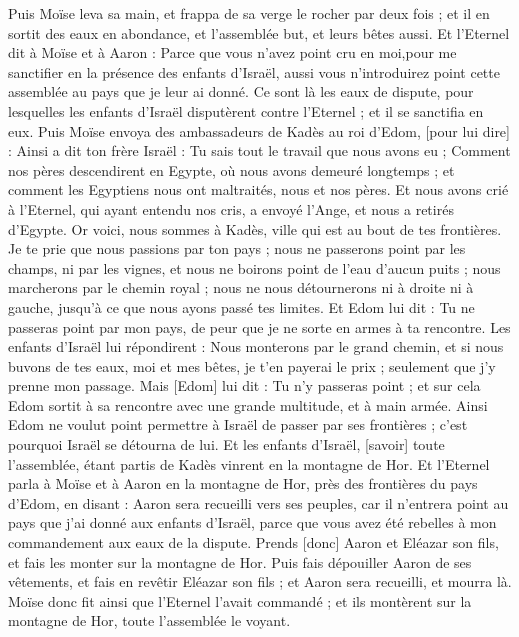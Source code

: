 \begin{multicols}{2}
Puis Moïse leva sa main, et frappa de sa verge le rocher par deux fois ; et il en sortit des eaux en abondance, et l'assemblée but, et leurs bêtes aussi.
Et l'Eternel dit à Moïse et à Aaron : Parce que vous n'avez point cru en moi,pour me sanctifier en la présence des enfants d'Israël, aussi vous n'introduirez point cette assemblée au pays que je leur ai donné.
Ce sont là les eaux de dispute, pour lesquelles les enfants d'Israël disputèrent contre l'Eternel ; et il se sanctifia en eux.
Puis Moïse envoya des ambassadeurs de Kadès au roi d'Edom, [pour lui dire] : Ainsi a dit ton frère Israël : Tu sais tout le travail que nous avons eu ;
Comment nos pères descendirent en Egypte, où nous avons demeuré longtemps ; et comment les Egyptiens nous ont maltraités, nous et nos pères.
Et nous avons crié à l'Eternel, qui ayant entendu nos cris, a envoyé l'Ange, et nous a retirés d'Egypte. Or voici, nous sommes à Kadès, ville qui est au bout de tes frontières.
Je te prie que nous passions par ton pays ; nous ne passerons point par les champs, ni par les vignes, et nous ne boirons point de l'eau d'aucun puits ; nous marcherons par le chemin royal ; nous ne nous détournerons ni à droite ni à gauche, jusqu'à ce que nous ayons passé tes limites.
Et Edom lui dit : Tu ne passeras point par mon pays, de peur que je ne sorte en armes à ta rencontre.
Les enfants d'Israël lui répondirent : Nous monterons par le grand chemin, et si nous buvons de tes eaux, moi et mes bêtes, je t'en payerai le prix ; seulement que j'y prenne mon passage.
Mais [Edom] lui dit : Tu n'y passeras point ; et sur cela Edom sortit à sa rencontre avec une grande multitude, et à main armée.
Ainsi Edom ne voulut point permettre à Israël de passer par ses frontières ; c'est pourquoi Israël se détourna de lui.
Et les enfants d'Israël, [savoir] toute l'assemblée, étant partis de Kadès vinrent en la montagne de Hor.
Et l'Eternel parla à Moïse et à Aaron en la montagne de Hor, près des frontières du pays d'Edom, en disant :
Aaron sera recueilli vers ses peuples, car il n'entrera point au pays que j'ai donné aux enfants d'Israël, parce que vous avez été rebelles à mon commandement aux eaux de la dispute.
Prends [donc] Aaron et Eléazar son fils, et fais les monter sur la montagne de Hor.
Puis fais dépouiller Aaron de ses vêtements, et fais en revêtir Eléazar son fils ; et Aaron sera recueilli, et mourra là.
Moïse donc fit ainsi que l'Eternel l'avait commandé ; et ils montèrent sur la montagne de Hor, toute l'assemblée le voyant.

\end{multicols}
